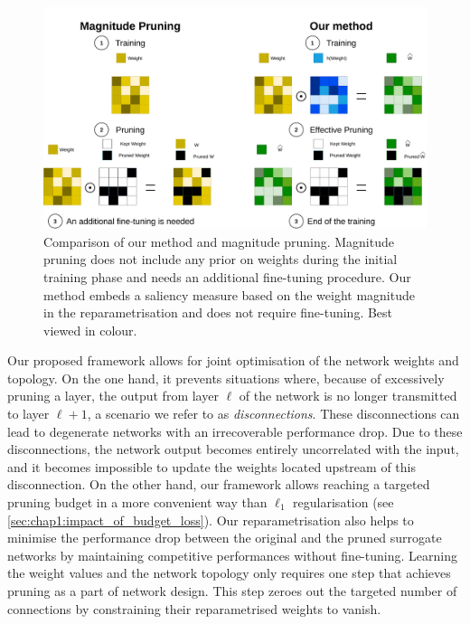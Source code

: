 \begin{figure}[ht]
  \centerline{\includegraphics[width=12.5cm]{chapter_1/assets/comparison_reparam_vs_mag_pruning.pdf}}
  \caption{Comparison of our method and magnitude pruning. Magnitude pruning
  does not include any prior on weights during the initial training phase and
  needs an additional fine-tuning procedure. Our method embeds a saliency
  measure based on the weight magnitude in the reparametrisation and does not
  require fine-tuning. Best viewed in colour.}
  \label{fig:chap1:comparison_reparam_vs_mag_pruning}
\end{figure}


Our proposed framework allows for joint optimisation of the network weights and
topology. On the one hand, it prevents situations where, because of excessively
pruning a layer, the output from layer $\ell$ of the network is no longer
transmitted to layer $\ell+1$, a scenario we refer to as \emph{disconnections}.
These disconnections can lead to degenerate networks with an irrecoverable
performance drop. Due to these disconnections, the network output becomes
entirely uncorrelated with the input, and it becomes impossible to update the
weights located upstream of this disconnection. On the other hand, our framework
allows reaching a targeted pruning budget in a more convenient way than $\ell_1$
regularisation (see \cref{sec:chap1:impact_of_budget_loss}). Our
reparametrisation also helps to minimise the performance drop between the
original and the pruned surrogate networks by maintaining competitive
performances without fine-tuning. Learning the weight values and the network
topology only requires one step that achieves pruning as a part of network
design. This step zeroes out the targeted number of connections by constraining
their reparametrised weights to vanish.


